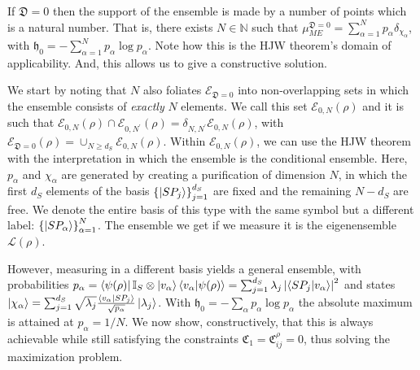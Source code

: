 \documentclass[draft,nofootinbib,pre,twocolumn,showpacs,showkeys,groupaddress,preprintnumbers,floatfix]{revtex4-1}
\newcommand{\1}{\mathbbm{1}}
\newcommand{\ID}{\mathfrak{D}}
\begin{document}
If $\ID = 0$ then the support of the ensemble is made by a number of points
which is a natural number. That is, there exists $N \in \mathbb{N}$ such that
$\mu^{\ID = 0}_{ME} = \sum_{\alpha = 1}^N p_\alpha \delta_{\chi_\alpha}$, with
$\mathfrak{h}_0 = - \sum_{\alpha=1}^N p_\alpha \log p_\alpha$. Note how this is
the HJW theorem's domain of applicability. And, this allows us to give a
constructive solution.

We start by noting that $N$ also foliates $\mathcal{E}_{\ID = 0}$ into
non-overlapping sets in which the ensemble consists of \emph{exactly} $N$
elements. We call this set $\mathcal{E}_{0,N}(\rho)$ and it is such that
$\mathcal{E}_{0,N}(\rho) \cap \mathcal{E}_{0,N^{'}}(\rho) =
\delta_{N,N^{'}}\mathcal{E}_{0,N}(\rho)$, with $\mathcal{E}_{\ID=0}(\rho) =
\cup_{N \geq d_S} \mathcal{E}_{0,N}(\rho)$. Within $\mathcal{E}_{0,N}(\rho)$,
we can use the HJW theorem with the interpretation in which the ensemble is the
conditional ensemble. Here, $p_\alpha$ and $\chi_\alpha$ are generated by
creating a purification of dimension $N$, in which the first $d_S$ elements of
the basis $\left\{\ket{SP_j}\right\}_{j=1}^{d_S}$ are fixed and the remaining
$N-d_S$ are free. We denote the entire basis of this type with the same symbol
but a different label: $\left\{\ket{SP_\alpha}\right\}_{\alpha=1}^{N}$. The
ensemble we get if we measure it is the eigenensemble $\mathcal{L}(\rho)$.

However, measuring in a different basis yields a general ensemble, with probabilities
$p_\alpha = \bra{\psi(\rho)} \mathbb{I}_S \otimes \ket{v_\alpha}\bra{v_\alpha}\ket{\psi(\rho)} = \sum_{j=1}^{d_S} \lambda_j \left\vert \braket{SP_j}{v_\alpha}\right\vert^2$
and states $\ket{\chi_\alpha} =  \sum_{j=1}^{d_S} \sqrt{\lambda_j} \frac{\braket{v_\alpha}{SP_{j}}}{\sqrt{p_\alpha}} \ket{\lambda_j}$.
With $\mathfrak{h}_0 = - \sum_\alpha p_\alpha \log p_\alpha$ the absolute maximum is attained at $p_\alpha = 1/N$. We now show,
constructively, that this is always achievable while still satisfying the constraints $\mathfrak{C}_1 = \mathfrak{C}^{\rho}_{ij} = 0$, thus
solving the maximization problem.
\end{document}

